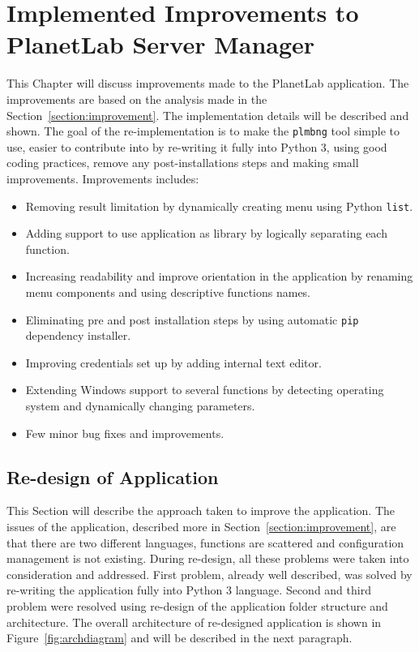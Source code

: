 \chapter{Implemented Improvements to PlanetLab Server Manager}
\label{chapter:improve}
This Chapter will discuss improvements made to the PlanetLab application. The improvements are based on the analysis made in the Section~\ref{section:improvement}. The implementation details will be described and shown. The goal of the re-implementation is to make the \texttt{plmbng} tool simple to use, easier to contribute into by re-writing it fully into Python 3, using good coding practices, remove any post-installations steps and making small improvements. Improvements includes:
\begin{itemize}
	\item Removing result limitation by dynamically creating menu using Python \texttt{list}.
	\item Adding support to use application as library by logically separating each function.
	\item Increasing readability and improve orientation in the application by renaming menu components and using descriptive functions names.
	\item Eliminating pre and post installation steps by using automatic \texttt{pip} dependency installer.
	\item Improving credentials set up by adding internal text editor.
	\item Extending Windows support to several functions by detecting operating system and dynamically changing parameters.
	\item Few minor bug fixes and improvements.
\end{itemize}

\section{Re-design of Application}
\label{section:redesign}
This Section will describe the approach taken to improve the application. The issues of the application, described more in Section~\ref{section:improvement}, are that there are two different languages, functions are scattered and configuration management is not existing. During re-design, all these problems were taken into consideration and addressed. First problem, already well described, was solved by re-writing the application fully into Python 3 language. Second and third problem were resolved using re-design of the application folder structure and architecture. The overall architecture of re-designed application is shown in Figure~\ref{fig:archdiagram} and will be described in the next paragraph.\\

